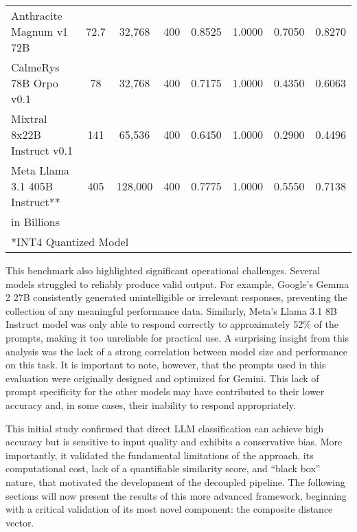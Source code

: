 \begin{table*}[tb]
{\begin{tabular}{lccccccc}
        Anthracite Magnum v1 72B        & 72.7                 & 32,768                  & 400              & 0.8525            & 1.0000 & 0.7050          & 0.8270          \\
        CalmeRys 78B Orpo v0.1          & 78                   & 32,768                  & 400              & 0.7175            & 1.0000 & 0.4350          & 0.6063          \\
        Mixtral 8x22B Instruct v0.1     & 141                  & 65,536                  & 400              & 0.6450            & 1.0000 & 0.2900          & 0.4496          \\
        Meta Llama 3.1 405B Instruct**  & 405                  & 128,000                 & 400              & 0.7775            & 1.0000 & 0.5550          & 0.7138          \\
        \bottomrule
        \multicolumn{8}{l}{\footnotesize *in Billions}                                                                                                                       \\
        \multicolumn{8}{l}{\footnotesize **INT4 Quantized Model}
    \end{tabular}
    }
\end{table*}

This benchmark also highlighted significant operational challenges. Several models struggled to reliably produce valid output. For example, Google's Gemma 2 27B consistently generated unintelligible or irrelevant responses, preventing the collection of any meaningful performance data. Similarly, Meta's Llama 3.1 8B Instruct model was only able to respond correctly to approximately 52\% of the prompts, making it too unreliable for practical use. A surprising insight from this analysis was the lack of a strong correlation between model size and performance on this task. It is important to note, however, that the prompts used in this evaluation were originally designed and optimized for Gemini. This lack of prompt specificity for the other models may have contributed to their lower accuracy and, in some cases, their inability to respond appropriately.

This initial study confirmed that direct LLM classification can achieve high accuracy but is sensitive to input quality and exhibits a conservative bias. More importantly, it validated the fundamental limitations of the approach, its computational cost, lack of a quantifiable similarity score, and ``black box'' nature, that motivated the development of the decoupled pipeline. The following sections will now present the results of this more advanced framework, beginning with a critical validation of its most novel component: the composite distance vector.

